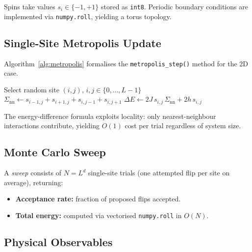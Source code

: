 \documentclass[11pt,letterpaper,twocolumn]{article}
\newcommand{\code}[1]{\texttt{#1}}
\theoremstyle{definition}
\begin{document}
\noindent
Spins take values $s_i \in \{-1,+1\}$ stored as \code{int8}.  Periodic boundary conditions are implemented via \code{numpy.roll}, yielding a torus topology.

\subsection{Single-Site Metropolis Update}

Algorithm~\ref{alg:metropolis} formalises the \code{metropolis\_step()} method for the 2D case.

\begin{algorithm}[H]
\SetAlgoLined
{}
Select random site $(i,j)$, \; $i,j \in \{0,\ldots,L{-}1\}$\;
$\Sigma_{\mathrm{nn}} \gets s_{i-1,j} + s_{i+1,j} + s_{i,j-1} + s_{i,j+1}$
\quad{}
$\Delta E \gets 2J\,s_{i,j}\,\Sigma_{\mathrm{nn}} + 2h\,s_{i,j}$\;
\caption{Metropolis single-site update (2D).}\label{alg:metropolis}
\end{algorithm}

\noindent
The energy-difference formula exploits locality: only nearest-neighbour interactions contribute, yielding $O(1)$ cost per trial regardless of system size.

\subsection{Monte Carlo Sweep}

A \emph{sweep} consists of $N = L^d$ single-site trials (one attempted flip per site on average), returning:

\begin{itemize}
  \item \textbf{Acceptance rate:} fraction of proposed flips accepted.
  \item \textbf{Total energy:} computed via vectorised \code{numpy.roll} in $O(N)$.
\end{itemize}

\subsection{Physical Observables}
\end{document}

